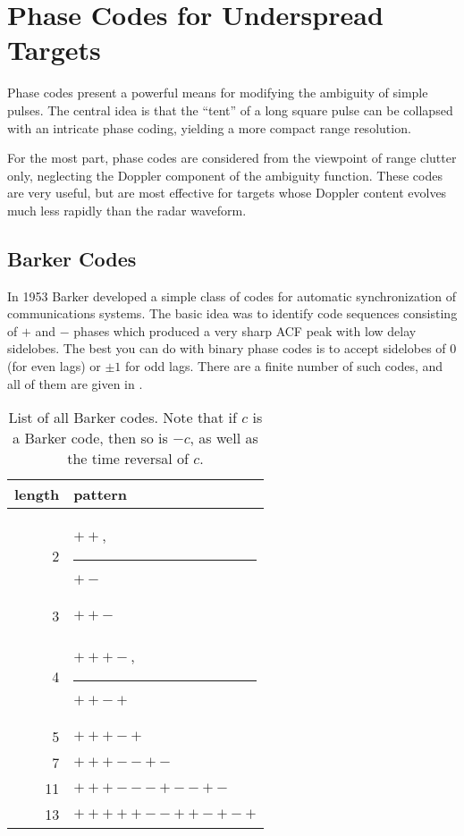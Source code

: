 \chapter{Phase Codes for Underspread Targets}

Phase codes present a powerful means for modifying the ambiguity of
simple pulses.   The central idea is that the ``tent'' of a long
square pulse can be collapsed with an intricate phase coding, yielding
a more compact range resolution.  

For the most part, phase codes are considered from the viewpoint of
range clutter only, neglecting the Doppler component of the ambiguity
function.  These codes are very useful, but are most effective for
targets whose Doppler content evolves much less rapidly than the radar
waveform.

\section{Barker Codes}

In 1953 Barker\cite{barker-1953} developed a simple class of codes for
automatic synchronization of communications systems.  The basic idea
was to identify code sequences consisting of $+$ and $-$ phases which
produced a very sharp ACF peak with low delay sidelobes.  The best you
can do with binary phase codes is to accept sidelobes of $0$ (for even
lags) or $\pm 1$ for odd lags.  There are a finite number of such
codes, and all of them are given in .


\begin{table}
\caption{\label{t:barker} List of all Barker codes.  Note that if $c$
  is a Barker code, then so is $-c$, as well as the time reversal of $c$.}
\begin{center}
\begin{tabular}{rl}
length & pattern \\ \hline
2      & $++$, \rule{1em}{0mm} $+-$ \\
3      & $++-$ \\
4      & $+++-$,  \rule{1em}{0mm} $++-+$ \\
5      & $+++-+$ \\
7      & $+++--+-$ \\
11     & $+++---+--+-$ \\
13     & $+++++--++-+-+$
\end{tabular}
\end{center}
\end{table}

